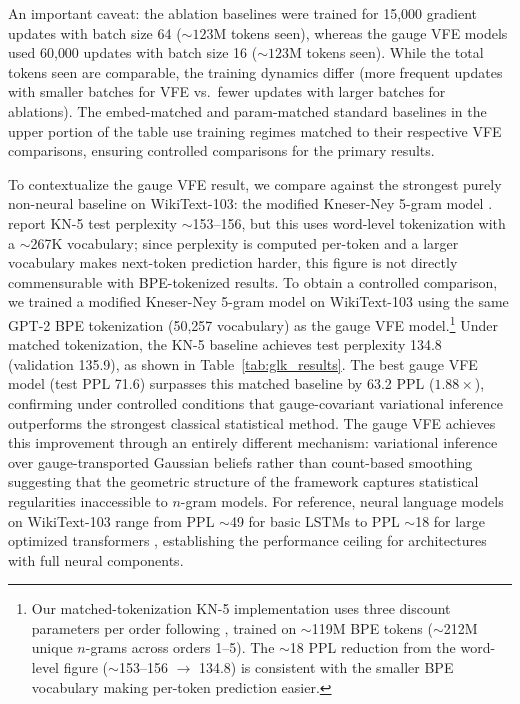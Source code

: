 \documentclass[twoside,11pt]{article}
\begin{document}
An important caveat: the ablation baselines were trained for 15{,}000 gradient updates with batch size 64 (${\sim}123$M tokens seen), whereas the gauge VFE models used 60{,}000 updates with batch size 16 (${\sim}123$M tokens seen). While the total tokens seen are comparable, the training dynamics differ (more frequent updates with smaller batches for VFE vs.\ fewer updates with larger batches for ablations). The embed-matched and param-matched standard baselines in the upper portion of the table use training regimes matched to their respective VFE comparisons, ensuring controlled comparisons for the primary results.

To contextualize the gauge VFE result, we compare against the strongest purely non-neural baseline on WikiText-103: the modified Kneser-Ney 5-gram model \citep{chen1998empirical}. \citet{merity2017pointer} report KN-5 test perplexity $\sim$153--156, but this uses word-level tokenization with a $\sim$267K vocabulary; since perplexity is computed per-token and a larger vocabulary makes next-token prediction harder, this figure is not directly commensurable with BPE-tokenized results. To obtain a controlled comparison, we trained a modified Kneser-Ney 5-gram model on WikiText-103 using the same GPT-2 BPE tokenization (50{,}257 vocabulary) as the gauge VFE model.\footnote{Our matched-tokenization KN-5 implementation uses three discount parameters per order following \citet{chen1998empirical}, trained on $\sim$119M BPE tokens ($\sim$212M unique $n$-grams across orders 1--5). The $\sim$18 PPL reduction from the word-level figure ($\sim$153--156 $\to$ 134.8) is consistent with the smaller BPE vocabulary making per-token prediction easier.} Under matched tokenization, the KN-5 baseline achieves test perplexity 134.8 (validation 135.9), as shown in Table~\ref{tab:glk_results}. The best gauge VFE model (test PPL 71.6) surpasses this matched baseline by 63.2 PPL ($1.88\times$), confirming under controlled conditions that gauge-covariant variational inference outperforms the strongest classical statistical method. The gauge VFE achieves this improvement through an entirely different mechanism: variational inference over gauge-transported Gaussian beliefs rather than count-based smoothing suggesting that the geometric structure of the framework captures statistical regularities inaccessible to $n$-gram models. For reference, neural language models on WikiText-103 range from PPL $\sim$49 for basic LSTMs \citep{grave2017improving} to PPL $\sim$18 for large optimized transformers \citep{dai2019transformerxl}, establishing the performance ceiling for architectures with full neural components.
\end{document}
